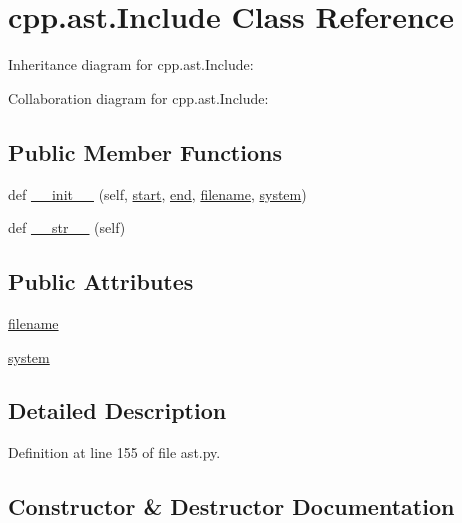 \hypertarget{classcpp_1_1ast_1_1_include}{}\section{cpp.\+ast.\+Include Class Reference}
\label{classcpp_1_1ast_1_1_include}


Inheritance diagram for cpp.\+ast.\+Include\+:


Collaboration diagram for cpp.\+ast.\+Include\+:
\subsection*{Public Member Functions}
\begin{DoxyCompactItemize}
\item 
def \hyperlink{classcpp_1_1ast_1_1_include_a41b000a9f16a9a1840e56a761bb7045c}{\+\_\+\+\_\+init\+\_\+\+\_\+} (self, \hyperlink{classcpp_1_1ast_1_1_node_a7b2aa97e6a049bb1a93aea48c48f1f44}{start}, \hyperlink{classcpp_1_1ast_1_1_node_a3c5e5246ccf619df28eca02e29d69647}{end}, \hyperlink{classcpp_1_1ast_1_1_include_a9ecff64f127655d3c17e9abe4ebe3852}{filename}, \hyperlink{classcpp_1_1ast_1_1_include_a2e8e535b1af7d9b0ff94d0ae9f86e5c5}{system})
\item 
def \hyperlink{classcpp_1_1ast_1_1_include_ad7d9e5e8f46dcb1a91a282e609412a3e}{\+\_\+\+\_\+str\+\_\+\+\_\+} (self)
\end{DoxyCompactItemize}
\subsection*{Public Attributes}
\begin{DoxyCompactItemize}
\item 
\hyperlink{classcpp_1_1ast_1_1_include_a9ecff64f127655d3c17e9abe4ebe3852}{filename}
\item 
\hyperlink{classcpp_1_1ast_1_1_include_a2e8e535b1af7d9b0ff94d0ae9f86e5c5}{system}
\end{DoxyCompactItemize}


\subsection{Detailed Description}


Definition at line 155 of file ast.\+py.



\subsection{Constructor \& Destructor Documentation}
